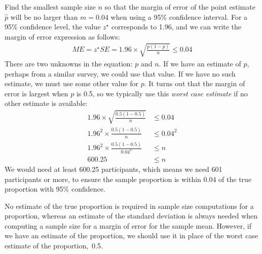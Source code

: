 \begin{example}{Find the smallest sample size $n$ so that the margin of error of the point estimate $\hat{p}$ will be no larger than $m=0.04$ when using a 95\% confidence interval.}
For a 95\% confidence level, the value $z^{\star}$ corresponds to 1.96, and we can write the margin of error expression as follows:
\begin{align*}
ME = z^{\star}SE = 1.96\times \sqrt{\frac{p(1-p)}{n}} \leq 0.04
\end{align*}
There are two unknowns in the equation: $p$ and $n$. If we have an estimate of $p$, perhaps from a similar survey, we could use that value. If we have no such estimate, we must use some other value for $p$. It turns out that the margin of error is largest when $p$ is 0.5, so we typically use this \emph{worst case estimate} if no other estimate is available:
\begin{align*}
	1.96\times \sqrt{\frac{0.5(1-0.5)}{n}} &\leq 0.04 \\
	1.96^2\times \frac{0.5(1-0.5)}{n} &\leq 0.04^2 \\
	1.96^2\times \frac{0.5(1-0.5)}{0.04^2} &\leq n \\
	600.25 &\leq n
\end{align*}
We would need at least 600.25 participants, which means we need 601 participants or more, to ensure the sample proportion is within 0.04 of the true proportion with 95\% confidence.
\end{example}

No estimate of the true proportion is required in sample size computations for a proportion, whereas an estimate of the standard deviation is always needed when computing a sample size for a margin of error for the sample mean. However, if we have an estimate of the proportion, we should use it in place of the worst case estimate of the proportion,~0.5.

